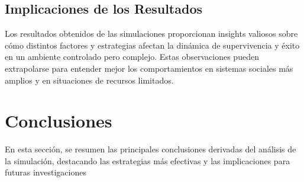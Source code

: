 \documentclass[11pt]{article}
\begin{document}


\subsection{Implicaciones de los Resultados}
Los resultados obtenidos de las simulaciones proporcionan insights valiosos sobre cómo distintos factores y estrategias afectan la dinámica de supervivencia y éxito en un ambiente controlado pero complejo. Estas observaciones pueden extrapolarse para entender mejor los comportamientos en sistemas sociales más amplios y en situaciones de recursos limitados.

\section{Conclusiones}
En esta sección, se resumen las principales conclusiones derivadas del análisis de la simulación, destacando las estrategias más efectivas y las implicaciones para futuras investigaciones
\end{document}
